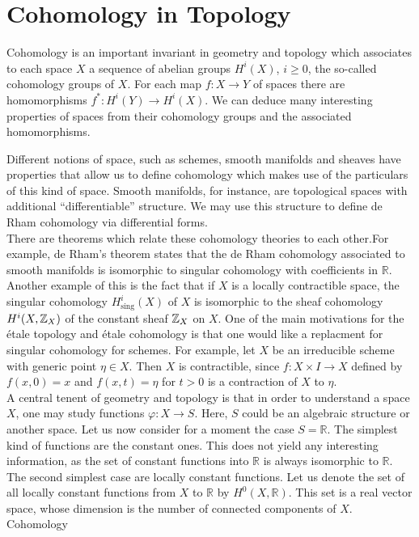 
\section{Cohomology in Topology}
Cohomology is an important invariant in geometry and topology which associates to each space $X$ a sequence of abelian groups $H^i(X)$, $i \ge 0$, the so-called cohomology groups of $X$. For each map $f: X \to Y$ of spaces there are homomorphisms $f^*: H^i(Y) \to H^i(X)$. We can deduce many interesting properties of spaces from their cohomology groups and the associated homomorphisms.

Different notions of space, such as schemes, smooth manifolds and sheaves have properties that allow us to define cohomology which makes use of the particulars of this kind of space. Smooth manifolds, for instance, are topological spaces with additional “differentiable” structure. We may use this structure to define de Rham cohomology via differential forms.\\

There are theorems which relate these cohomology theories to each other.For example, de Rham's theorem states that the de Rham cohomology associated to smooth manifolds is isomorphic to singular cohomology with coefficients in $\mathbb{R}$. Another example of this is the fact that if $X$ is a locally contractible space, the singular cohomology $H_{\text{sing}}^i(X)$ of $X$ is isomorphic to the sheaf cohomology $H^i(X, \mathbb{Z}_X)$ of the constant sheaf $\mathbb{Z}_X$ on $X$. One of the main motivations for the \'etale topology and \'etale cohomology is that one would like a replacment for singular cohomology for schemes. For example, let $X$ be an irreducible scheme with generic point $\eta \in X$. Then $X$ is contractible, since $f: X \times I \to X$ defined by $f(x,0) = x$ and $f(x,t) = \eta$ for $t > 0$ is a contraction of $X$ to $\eta$.\\

A central tenent of geometry and topology is that in order to understand a space $X$, one may study functions $\varphi: X \to S$. Here, $S$ could be an algebraic structure or another space. Let us now consider for a moment the case $S=\mathbb{R}$. The simplest kind of functions are the constant ones. This does not yield any interesting information, as the set of constant functions into $\mathbb{R}$ is always isomorphic to $\mathbb{R}$. The second simplest case are locally constant functions. Let us denote the set of all locally constant functions from $X$ to $\mathbb{R}$ by $H^0(X,\mathbb{R})$. This set is a real vector space, whose dimension is the number of connected components of $X$. Cohomology

